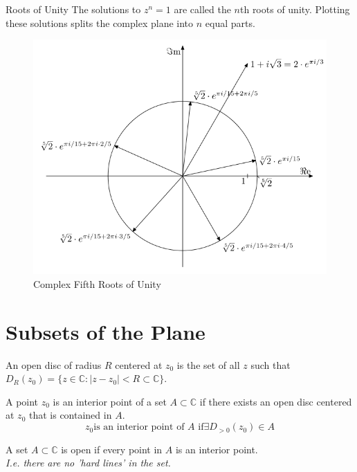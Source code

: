 \begin{remark}
    Roots of Unity
    The solutions to $z^n = 1$ are called the $n$th roots of unity. Plotting these solutions splits the complex plane into $n$ equal parts.
    \begin{figure}
        \centering
        \includegraphics[scale = 0.2]{./LECTURE_1/Complex_fifth_roots.png}
        \caption{Complex Fifth Roots of Unity}
        \label{fig:roots}
    \end{figure}
\end{remark}
\section{Subsets of the Plane}
\begin{definition}
    An open disc of radius $R$ centered at $z_0$ is the set of all $z$ such that $D_R(z_0) = \{z \in \mathbb{C} : |z - z_0| < R \subset \mathbb{C}\}$.
\end{definition}
\begin{definition}
    A point $z_0$ is an interior point of a set $A \subset \mathbb{C}$ if there exists an open disc centered at $z_0$ that is contained in $A$.
    \[z_0 \text{is an interior point of $A$ if} \exists D_{>0}(z_0)\in A\]
\end{definition}

\begin{definition}
    A set $A \subset \mathbb{C}$ is open if every point in $A$ is an interior point. \\
    \textit{I.e. there are no 'hard lines' in the set.}
\end{definition}

